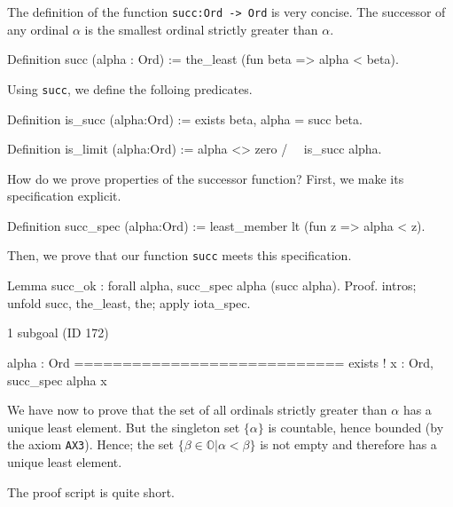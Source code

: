 {The definition of the function \texttt{succ:Ord -> Ord} is very concise. The successor of any ordinal $\alpha$ is the smallest ordinal strictly greater than $\alpha$.

\label{Functions:succ-sch}

\begin{Coqsrc}
Definition succ (alpha : Ord) := the_least (fun beta => alpha < beta).
\end{Coqsrc}

Using \texttt{succ}, we define the folloing predicates.

\begin{Coqsrc}
Definition is_succ (alpha:Ord) := exists beta, alpha = succ beta.

Definition is_limit (alpha:Ord) := alpha <> zero /\ ~ is_succ alpha.
\end{Coqsrc}




How do we prove properties of the successor function?
First, we make its specification explicit.

\begin{Coqsrc}
Definition succ_spec (alpha:Ord) :=
  least_member   lt (fun z => alpha < z).
\end{Coqsrc}

Then, we prove that our function \texttt{succ} meets this specification. 


\begin{Coqsrc}
Lemma succ_ok : forall alpha,  succ_spec alpha  (succ alpha).
Proof.
  intros; unfold succ, the_least, the;  apply iota_spec.
\end{Coqsrc}

\begin{Coqanswer}
1 subgoal (ID 172)
  
  alpha : Ord
  ============================
  exists ! x : Ord, succ_spec alpha x
\end{Coqanswer}

We have now to prove that the set of all ordinals strictly greater than $\alpha$ has a unique least element. But the singleton set $\{\alpha\}$ is countable, hence  bounded (by the axiom \texttt{AX3}). Hence; the set $\{\beta\in\mathbb{O}|\alpha < \beta\}$ is not empty
and therefore has a unique least element.

The \coq{} proof script is quite short.

}
